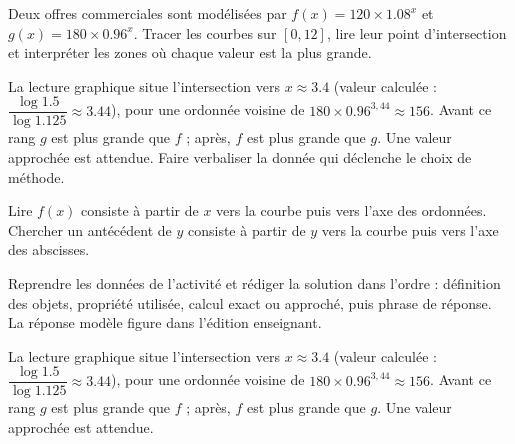 \begin{activity}
Deux offres commerciales sont modélisées par $f(x)=120\times\num{1,08}^x$ et $g(x)=180\times\num{0,96}^x$. Tracer les courbes sur $[0,12]$, lire leur point d'intersection et interpréter les zones où chaque valeur est la plus grande.
\begin{center}\end{center}
\end{activity}
\begin{solution}La lecture graphique situe l'intersection vers $x\approx\num{3,4}$ (valeur calculée : $\dfrac{\log\num{1,5}}{\log\num{1,125}}\approx\num{3,44}$), pour une ordonnée voisine de $\num{180}\times\num{0,96}^{3,44}\approx\num{156}$. Avant ce rang $g$ est plus grande que $f$ ; après, $f$ est plus grande que $g$. Une valeur approchée est attendue. Faire verbaliser la donnée qui déclenche le choix de méthode.\end{solution}

\begin{summary}Lire $f(x)$ consiste à partir de $x$ vers la courbe puis vers l'axe des ordonnées. Chercher un antécédent de $y$ consiste à partir de $y$ vers la courbe puis vers l'axe des abscisses.\end{summary}

\begin{example}
Reprendre les données de l'activité et rédiger la solution dans l'ordre : définition des objets, propriété utilisée, calcul exact ou approché, puis phrase de réponse. La réponse modèle figure dans l'édition enseignant.
\end{example}
\begin{solution}La lecture graphique situe l'intersection vers $x\approx\num{3,4}$ (valeur calculée : $\dfrac{\log\num{1,5}}{\log\num{1,125}}\approx\num{3,44}$), pour une ordonnée voisine de $\num{180}\times\num{0,96}^{3,44}\approx\num{156}$. Avant ce rang $g$ est plus grande que $f$ ; après, $f$ est plus grande que $g$. Une valeur approchée est attendue.\end{solution}

